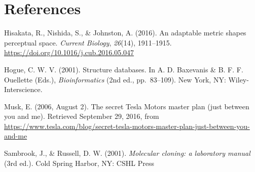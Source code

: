 \documentclass[american,a4paper,]{article}
\begin{document}
\newpage

\hypertarget{references}{%
\section*{References}\label{references}}

Hisakata, R., Nishida, S., \& Johnston, A. (2016). An adaptable metric
shapes perceptual space. \emph{Current Biology}, \emph{26}(14),
1911--1915. \url{https://doi.org/10.1016/j.cub.2016.05.047}

Hogue, C. W. V. (2001). Structure databases. In A. D. Baxevanis \& B. F.
F. Ouellette (Eds.), \emph{Bioinformatics} (2nd ed., pp.~83--109). New
York, NY: Wiley-Interscience.

Musk, E. (2006, August 2). The secret Tesla Motors master plan (just
between you and me). Retrieved September 29, 2016, from
\url{https://www.tesla.com/blog/secret-tesla-motors-master-plan-just-between-you-and-me}

Sambrook, J., \& Russell, D. W. (2001). \emph{Molecular cloning: a
laboratory manual} (3rd ed.). Cold Spring Harbor, NY: CSHL Press
\end{document}
